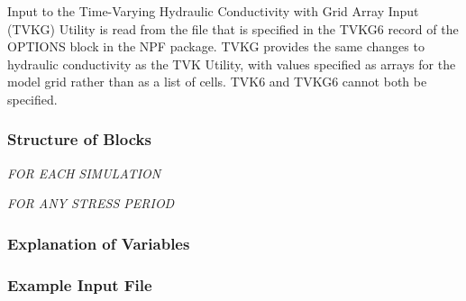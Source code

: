 Input to the Time-Varying Hydraulic Conductivity with Grid Array Input (TVKG) Utility is read from the file that is specified in the TVKG6 record of the OPTIONS block in the NPF package.  TVKG provides the same changes to hydraulic conductivity as the TVK Utility, with values specified as arrays for the model grid rather than as a list of cells.  TVK6 and TVKG6 cannot both be specified.


\vspace{5mm}
\subsubsection{Structure of Blocks}
\vspace{5mm}

\noindent \textit{FOR EACH SIMULATION}

\vspace{5mm}
\noindent \textit{FOR ANY STRESS PERIOD}


\vspace{5mm}
\subsubsection{Explanation of Variables}
\begin{description}

\end{description}

\vspace{5mm}
\subsubsection{Example Input File}

